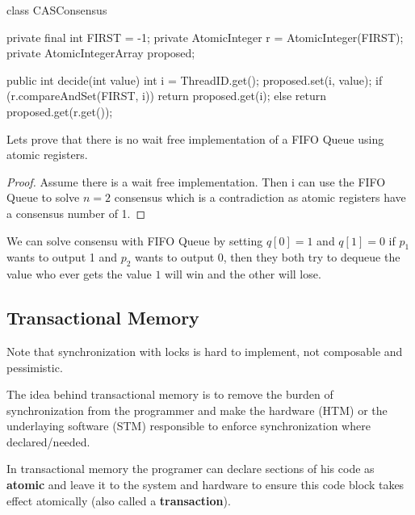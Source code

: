 \begin{codeexample}
class CASConsensus {
    private final int FIRST = -1;
    private AtomicInteger r = AtomicInteger(FIRST);
    private AtomicIntegerArray proposed;

    public int decide(int value) {
        int i = ThreadID.get();
        proposed.set(i, value);
        if (r.compareAndSet(FIRST, i)) {
            return proposed.get(i);
        } else {
            return proposed.get(r.get());
        }
    }
}
\end{codeexample}

\begin{example}
    Lets prove that there is no wait free implementation of a FIFO Queue using atomic registers.
\end{example}

\begin{proof}
    Assume there is a wait free implementation. Then i can use the FIFO Queue to solve $n=2$ consensus which is a contradiction as atomic registers have a consensus number of 1.
\end{proof}

\begin{remark}
    We can solve consensu with FIFO Queue by setting $q[0] = 1$ and $q[1] = 0$ if $p_1$ wants to output 1 and $p_2$ wants to output 0, then they both try to dequeue the value who ever gets the value $1$ will win and the other will lose. 
\end{remark}

\subsection{Transactional Memory}

\begin{remark}
    Note that synchronization with locks is hard to implement, not composable and pessimistic.
\end{remark}

\begin{remark}
    The idea behind transactional memory is to remove the burden of synchronization from the programmer and make the hardware (HTM) or the underlaying software (STM) responsible to enforce synchronization where declared/needed.
\end{remark}

\begin{definition}
    In transactional memory the programer can declare sections of his code as \textbf{atomic} and leave it to the system and hardware to ensure this code block takes effect atomically (also called a \textbf{transaction}).
\end{definition}

